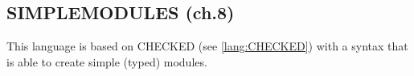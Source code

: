 \documentclass[../codeprint.tex]{subfiles}
\begin{document}
\subsection{SIMPLEMODULES (ch.8)}
This language is  based on CHECKED (see \autoref{lang:CHECKED}) with a syntax that is able to create simple (typed) modules. 



\end{document}
